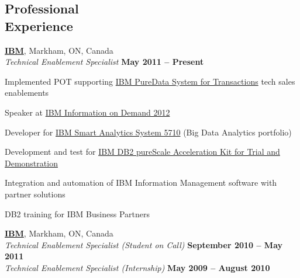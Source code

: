 \documentclass[margin,line]{resume}
\begin{document}
\begin{resume}
\section{\mysidestyle Professional\\Experience}

	\textbf{\href{http://www.ibm.com/}{IBM}}, Markham, ON, Canada					\vspace{2mm}\\\vspace{1mm}
	\textsl{Technical Enablement Specialist}				\hfill\textbf{May 2011 -- Present}		\\\vspace{-3mm}
	\begin{list2}
		\item Implemented POT supporting \href{https://www-01.ibm.com/software/data/puredata/transactions/}{IBM PureData System for Transactions} tech sales enablements
		\item Speaker at \href{https://www-01.ibm.com/software/data/2012-conference/}{IBM Information on Demand 2012}
		\item Developer for \href{http://www-01.ibm.com/software/data/infosphere/smart-analytics-system/5710/}{IBM Smart Analytics System 5710} (Big Data Analytics portfolio)
		\item Development and test for \href{http://www.ibm.com/developerworks/wikis/display/im/IBM+DB2+pureScale+Acceleration+Kit+for+Trial+and+Demonstration}{IBM DB2 pureScale Acceleration Kit for Trial and Demonstration}
		\item Integration and automation of IBM Information Management software with partner solutions
		\item DB2 training for IBM Business Partners
	\end{list2}
	\textbf{\href{http://www.ibm.com/}{IBM}}, Markham, ON, Canada					\vspace{2mm}\\\vspace{1mm}
	\textsl{Technical Enablement Specialist (Student on Call)}		\hfill\textbf{September 2010 -- May 2011}	\\
	\textsl{\hspace*{1.0mm}Technical Enablement Specialist (Internship)}	\hfill\textbf{May 2009 -- August 2010}		\\\vspace{-1.5mm}
	\begin{list2}

\end{list2}
\end{resume}
\end{document}
